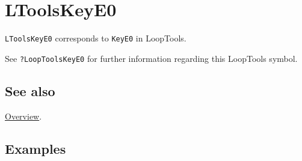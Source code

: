 \documentclass[../FeynHelpersManual.tex]{subfiles}
\begin{document}
\hypertarget{ltoolskeye0}{
\section{LToolsKeyE0}\label{ltoolskeye0}}

\texttt{LToolsKeyE0} corresponds to \texttt{KeyE0} in LoopTools.

See \texttt{?LoopTools\textasciigrave KeyE0} for further information
regarding this LoopTools symbol.

\subsection{See also}

\hyperlink{toc}{Overview}.

\subsection{Examples}
\end{document}
